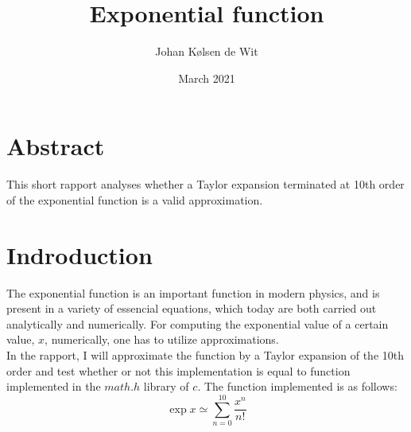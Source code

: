 \documentclass{article}
\title{Exponential function}
\author{Johan Kølsen de Wit}
\date{March 2021}
\begin{document}
\maketitle

\section*{Abstract}
This short rapport analyses whether a Taylor expansion terminated at 10th order of the exponential function is a valid approximation.
\section*{Indroduction}
The exponential function is an important function in modern physics, and is present in a variety of essencial equations, which today are both carried out analytically and numerically. For computing the exponential value of a certain value, $x$, numerically, one has to utilize approximations.\\In the rapport, I will approximate the function by a Taylor expansion of the 10th order and test whether or not this implementation is equal to function implemented in the $math.h$ library of $c$. The function implemented is as follows:
\begin{equation}
\exp{x}\simeq \sum_{n=0}^{10}\frac{x^n}{n!}
\label{Taylor}
\end{equation}
\end{document}
